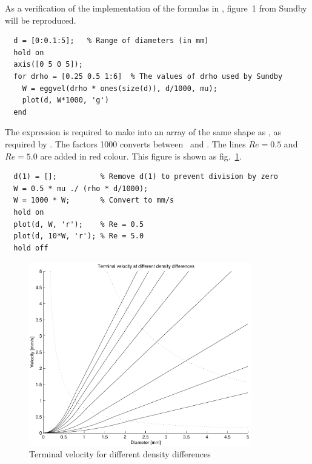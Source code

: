 As a verification of the implementation of the formulas in 
, figure~1 from Sundby  will be
reproduced.
\begin{verbatim}
  d = [0:0.1:5];   % Range of diameters (in mm) 
  hold on 
  axis([0 5 0 5]); 
  for drho = [0.25 0.5 1:6]  % The values of drho used by Sundby 
    W = eggvel(drho * ones(size(d)), d/1000, mu); 
    plot(d, W*1000, 'g')
  end
\end{verbatim}
The expression  is required to make 
into an array of the same shape as , as required by
. The factors 1000 converts between \mm\ and \m.
The lines $Re = 0.5$ and $Re = 5.0$ are added in red colour.
This figure is shown as fig.~\ref{fig:ex4a}.
\begin{verbatim}
  d(1) = [];          % Remove d(1) to prevent division by zero
  W = 0.5 * mu ./ (rho * d/1000); 
  W = 1000 * W;       % Convert to mm/s 
  hold on 
  plot(d, W, 'r');    % Re = 0.5 
  plot(d, 10*W, 'r'); % Re = 5.0 
  hold off 
\end{verbatim}


\begin{figure}
\begin{center}
\includegraphics[height=8cm]{ex4a}
\end{center}
\caption{Terminal velocity for different density differences}\label{fig:ex4a}
\end{figure}


